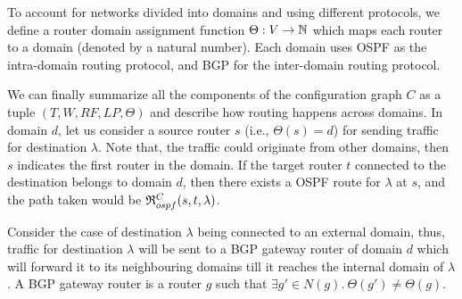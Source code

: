 To account for networks divided into domains and using different protocols,
we define a router domain assignment function
$\Theta: V \rightarrow \mathbb{N}$ which maps each router to a domain 
(denoted by a natural number). Each domain uses OSPF as the 
intra-domain routing protocol, and BGP for the inter-domain routing
protocol. 

We can finally summarize all the components of the configuration graph $C$
as a tuple $(T, W,RF,LP,\Theta)$ and describe how routing happens across domains.
In domain $d$, let us consider a source router $s$ (i.e., $\Theta(s) = d$) for 
sending traffic for destination $\lambda$. Note that, the traffic
could originate from other domains, then $s$ indicates the first
router in the domain.  If the target router $t$ 
connected to the destination belongs to domain $d$, then there exists
a OSPF route for $\lambda$ at $s$, and the path taken would be 
$\mathfrak{R}_{ospf}^C(s,t,\lambda)$.

Consider the case of destination $\lambda$ being connected 
to an external domain, thus, traffic for destination $\lambda$
will be sent to a BGP gateway router of domain $d$ which 
will forward it to its neighbouring domains till
it reaches the internal domain of $\lambda$. A BGP gateway
router is a router $g$ such that $\exists g' \in N(g). 
~\Theta(g') \not= \Theta(g)$. 


